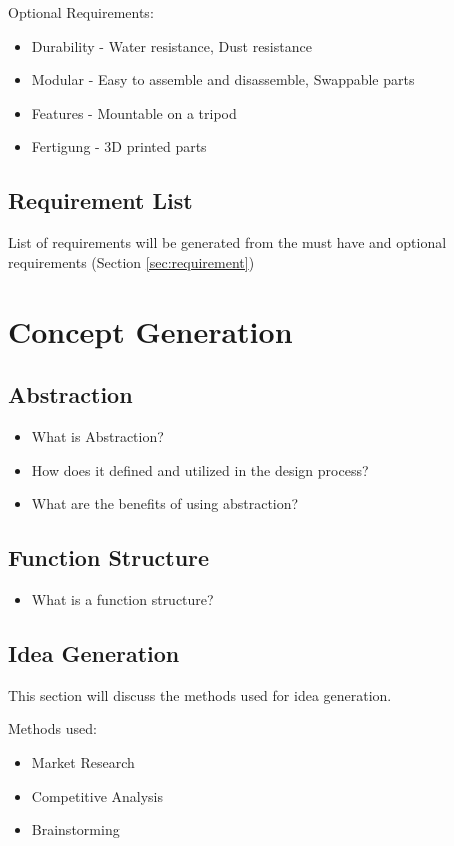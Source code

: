 Optional Requirements:
\begin{itemize}
    \item Durability - Water resistance, Dust resistance
    \item Modular - Easy to assemble and disassemble, Swappable parts
    \item Features - Mountable on a tripod
    \item Fertigung - 3D printed parts

\end{itemize}

\section{Requirement List}
List of requirements will be generated from the must have and optional requirements (Section \ref{sec:requirement})
\chapter{Concept Generation}
\section{Abstraction}
\begin{itemize}
    \item What is Abstraction?
    \item How does it defined and utilized in the design process?
    \item What are the benefits of using abstraction?
\end{itemize}
\section{Function Structure}
\begin{itemize}
    \item What is a function structure?
\end{itemize}

\section{Idea Generation}
This section will discuss the methods used for idea generation.


Methods used:
\begin{itemize}
    \item Market Research
    \item Competitive Analysis
    \item Brainstorming
\end{itemize}

